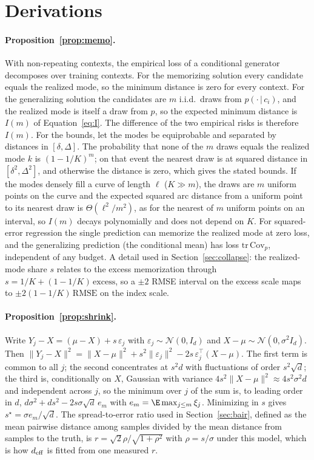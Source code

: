 \section{Derivations}
\label{app:proofs}

\paragraph{Proposition~\ref{prop:memo}.}
With non-repeating contexts, the empirical loss of a conditional generator decomposes over training contexts. For the memorizing solution every candidate equals the realized mode, so the minimum distance is zero for every context. For the generalizing solution the candidates are $m$ i.i.d.\ draws from $p(\cdot\,|\,c_i)$, and the realized mode is itself a draw from $p$, so the expected minimum distance is $I(m)$ of Equation~\ref{eq:I}. The difference of the two empirical risks is therefore $I(m)$. For the bounds, let the modes be equiprobable and separated by distances in $[\delta, \Delta]$. The probability that none of the $m$ draws equals the realized mode $k$ is $(1 - 1/K)^m$; on that event the nearest draw is at squared distance in $[\delta^2, \Delta^2]$, and otherwise the distance is zero, which gives the stated bounds. If the modes densely fill a curve of length $\ell$ ($K \gg m$), the draws are $m$ uniform points on the curve and the expected squared arc distance from a uniform point to its nearest draw is $\Theta(\ell^2/m^2)$, as for the nearest of $m$ uniform points on an interval, so $I(m)$ decays polynomially and does not depend on $K$. For squared-error regression the single prediction can memorize the realized mode at zero loss, and the generalizing prediction (the conditional mean) has loss $\mathrm{tr}\,\mathrm{Cov}_p$, independent of any budget. A detail used in Section~\ref{sec:collapse}: the realized-mode share $s$ relates to the excess memorization through $s = 1/K + (1 - 1/K)\,\mathrm{excess}$, so a $\pm 2$ RMSE interval on the excess scale maps to $\pm 2(1 - 1/K)\,\mathrm{RMSE}$ on the index scale.

\paragraph{Proposition~\ref{prop:shrink}.}
Write $Y_j - X = (\mu - X) + s\,\varepsilon_j$ with $\varepsilon_j \sim \mathcal{N}(0, I_d)$ and $X - \mu \sim \mathcal{N}(0, \sigma^2 I_d)$. Then $\|Y_j - X\|^2 = \|X - \mu\|^2 + s^2 \|\varepsilon_j\|^2 - 2 s\, \varepsilon_j^\top (X - \mu)$. The first term is common to all $j$; the second concentrates at $s^2 d$ with fluctuations of order $s^2 \sqrt{d}$; the third is, conditionally on $X$, Gaussian with variance $4 s^2 \|X - \mu\|^2 \approx 4 s^2 \sigma^2 d$ and independent across $j$, so the minimum over $j$ of the sum is, to leading order in $d$, $d\sigma^2 + d s^2 - 2 s \sigma \sqrt{d}\, e_m$ with $e_m = \E \max_{j \le m} \xi_j$. Minimizing in $s$ gives $s^\star = \sigma e_m / \sqrt{d}$. The spread-to-error ratio used in Section~\ref{sec:bair}, defined as the mean pairwise distance among samples divided by the mean distance from samples to the truth, is $r = \sqrt{2}\rho/\sqrt{1 + \rho^2}$ with $\rho = s/\sigma$ under this model, which is how $d_{\mathrm{eff}}$ is fitted from one measured $r$.

